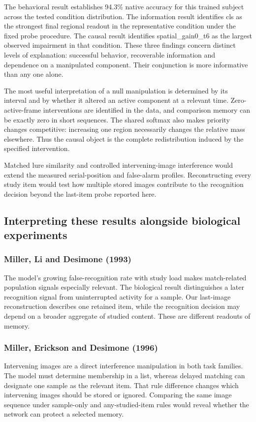 \documentclass[11pt]{article}
\begin{document}
The behavioral result establishes 94.3\% native accuracy for this trained subject across the tested condition distribution. The information result identifies cls as the strongest final regional readout in the representative condition under the fixed probe procedure. The causal result identifies spatial\_\allowbreak{}gain0\_\allowbreak{}t6 as the largest observed impairment in that condition. These three findings concern distinct levels of explanation: successful behavior, recoverable information and dependence on a manipulated component. Their conjunction is more informative than any one alone.

The most useful interpretation of a null manipulation is determined by its interval and by whether it altered an active component at a relevant time. Zero-active-frame interventions are identified in the data, and comparison memory can be exactly zero in short sequences. The shared softmax also makes priority changes competitive: increasing one region necessarily changes the relative mass elsewhere. Thus the causal object is the complete redistribution induced by the specified intervention.

Matched lure similarity and controlled intervening-image interference would extend the measured serial-position and false-alarm profiles. Reconstructing every study item would test how multiple stored images contribute to the recognition decision beyond the last-item probe reported here.

\subsection{Interpreting these results alongside biological experiments}
\subsubsection{Miller, Li and Desimone (1993)}
The model’s growing false-recognition rate with study load makes match-related population signals especially relevant. The biological result distinguishes a later recognition signal from uninterrupted activity for a sample. Our last-image reconstruction describes one retained item, while the recognition decision may depend on a broader aggregate of studied content. These are different readouts of memory. \cite{bio_miller93}

\subsubsection{Miller, Erickson and Desimone (1996)}
Intervening images are a direct interference manipulation in both task families. The model must determine membership in a list, whereas delayed matching can designate one sample as the relevant item. That rule difference changes which intervening images should be stored or ignored. Comparing the same image sequence under sample-only and any-studied-item rules would reveal whether the network can protect a selected memory. \cite{bio_miller96}
\end{document}
